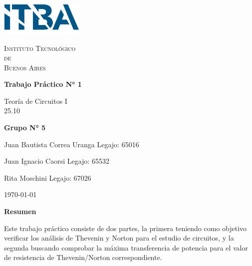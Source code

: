 \documentclass{article}
\newcommand{\Facultad}{Instituto Tecnológico \\de\\ Buenos Aires} %
\newcommand{\TPn}{Trabajo Práctico N° 1}
\begin{document}
    \begin{titlepage} %

        \begin{flushleft}
            \centering
            \includegraphics[width=0.3\textwidth]{Logo_ITBA.png}
        \end{flushleft}

        \centering
            
        {\scshape\LARGE \Facultad \par} %
        \vspace{1cm}                    %


        {\huge\bfseries \TPn \par}
        \vspace{1.5cm}
        {\Large Teoría de Circuitos I\\ 25.10 \par}
        \vfill                      %
        {\Large \bfseries Grupo N° 5 \par}
        \vspace{1cm}
        {\large Juan Bautista Correa Uranga \hfill Legajo: 65016 \par} %
        {\large Juan Ignacio Caorsi \hfill Legajo: 65532  \par}
        {\large Rita Moschini \hfill Legajo: 67026 \par} 
        \vfill
        {\large \today\par}
        \vfil

    \end{titlepage}


    {\centering \LARGE \bfseries Resumen \par}
        Este trabajo práctico consiste de dos partes, la primera teniendo como objetivo verificar los análisis de Thevenin y Norton para el estudio
        de circuitos, y la segunda buscando comprobar la máxima transferencia de potencia para el valor de resistencia de Thevenin/Norton correspondiente. \par
        
\end{document}
